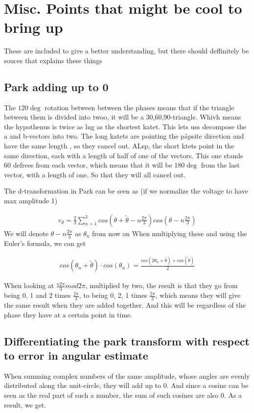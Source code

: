\chapter{Misc. Points that might be cool to bring up}
\label{chp:misc_cool_stuff}
These are included to give a better understanding, but there should deffinitely be souces that explains these things
\section{Park adding up to 0}
The $120\deg$ rotation between between the phases means that if the triangle between them is divided into twoo, it will be a 30,60,90-triangle. Whivh means the hypothenus is twice as lng as the shortest katet.  This lets uss decompose the a and b-vectors into two. The long katets are pointing the påpsite direction and have the same length , so they cancel out. ALsp, the short ktets point in the same direction, each with a length of half of one of the vectors. This one stands 60 defrees from each vector, which means that it will be $180\deg$ from the last vector, with a length of one. So that they will all cancel out. 



The d-transformation in Park can be seen as (if we normalize the voltage to have max amplitude 1) 

\begin{align}
    v_d = \frac{2}{3}\sum_{n=1}^3 cos( \theta +\tilde{\theta} - n \frac{2\pi}{3}) cos( \theta - n\frac{2\pi}{3}) 
\end{align}{}
We will denote $ \theta  - n \frac{2\pi}{3}$ as $\theta_n$ from now on
When multiplying these and using the Euler's formula, we can get 

\begin{align}
     cos( \theta_n +\tilde{\theta}  ) \cdot cos( \theta_n)  = \frac{cos( 2 \theta_n + \tilde{\theta}) + cos(\tilde{\theta})}{2}
\end{align}{}

When looking at $\frac{n2\pi}{3} mod 2\pi$, multiplied by two, the result is that they go from being 0, 1 and 2 times $\frac{2\pi }{3}$, to being 0, 2, 1 times $\frac{2\pi}{3}$, which means they will give the same result when they are added together. And this will be regardless of the phase they have at a certain point in time. 
\section{Differentiating the park transform with respect to error in angular estimate}
When summing complex numbers of the same amplitude, whose angles are evenly distributed along the unit-circle, they will add up to 0. And since a cosine can be seen as the real part of such a number, the sum of such cosines are also 0. As a result, we get. 

